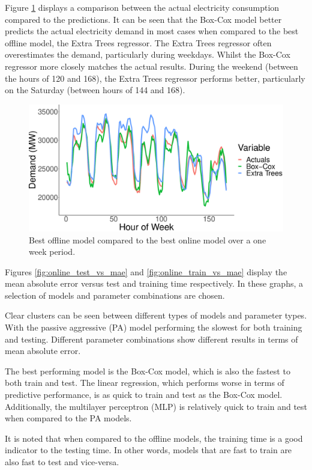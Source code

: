 \documentclass[final,3p,times,twocolumn,numbers]{elsarticle}
\begin{document}
Figure \ref{fig:both_actual_predicted} displays a comparison between the actual electricity consumption compared to the predictions. It can be seen that the Box-Cox model better predicts the actual electricity demand in most cases when compared to the best offline model, the Extra Trees regressor. The Extra Trees regressor often overestimates the demand, particularly during weekdays. Whilst the Box-Cox regressor more closely matches the actual results. During the weekend (between the hours of 120 and 168), the Extra Trees regressor performs better, particularly on the Saturday (between hours of 144 and 168). 


\begin{figure}[h]
\centering
\includegraphics[width=0.8\columnwidth]{figures/results/both_actual_predicted.eps}
\caption{Best offline model compared to the best online model over a one week period.}
\label{fig:both_actual_predicted}
\end{figure}

Figures \ref{fig:online_test_vs_mae} and \ref{fig:online_train_vs_mae} display the mean absolute error versus test and training time respectively. In these graphs, a selection of models and parameter combinations are chosen. 

Clear clusters can be seen between different types of models and parameter types. With the passive aggressive (PA) model performing the slowest for both training and testing. Different parameter combinations show different results in terms of mean absolute error.

The best performing model is the Box-Cox model, which is also the fastest to both train and test. The linear regression, which performs worse in terms of predictive performance, is as quick to train and test as the Box-Cox model. Additionally, the multilayer perceptron (MLP) is relatively quick to train and test when compared to the PA models. 

It is noted that when compared to the offline models, the training time is a good indicator to the testing time. In other words, models that are fast to train are also fast to test and vice-versa.
\end{document}
